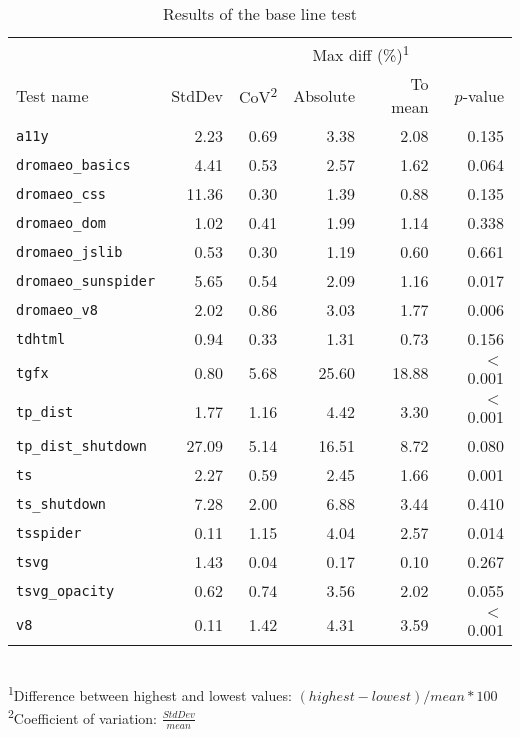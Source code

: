 \begin{table}
    \centering
    \caption{Results of the base line test}
    \label{tab:bg:results}
    \begin{tabular}{lrrrrr}
        \toprule
        & & & \multicolumn{2}{c}{Max diff (\%)\textsuperscript{1}} & \\
        \cmidrule(lr){4-5}
        Test name                   & StdDev & CoV\textsuperscript{2}  & Absolute & To mean & $p$-value \\
        \midrule
        \texttt{a11y}               & 2.23   & 0.69 & 3.38     & 2.08    & 0.135     \\
        \texttt{dromaeo\_basics}    & 4.41   & 0.53 & 2.57     & 1.62    & 0.064     \\
        \texttt{dromaeo\_css}       & 11.36  & 0.30 & 1.39     & 0.88    & 0.135     \\
        \texttt{dromaeo\_dom}       & 1.02   & 0.41 & 1.99     & 1.14    & 0.338     \\
        \texttt{dromaeo\_jslib}     & 0.53   & 0.30 & 1.19     & 0.60    & 0.661     \\
        \texttt{dromaeo\_sunspider} & 5.65   & 0.54 & 2.09     & 1.16    & 0.017     \\
        \texttt{dromaeo\_v8}        & 2.02   & 0.86 & 3.03     & 1.77    & 0.006     \\
        \texttt{tdhtml}             & 0.94   & 0.33 & 1.31     & 0.73    & 0.156     \\
        \texttt{tgfx}               & 0.80   & 5.68 & 25.60    & 18.88   & $<$ 0.001 \\
        \texttt{tp\_dist}           & 1.77   & 1.16 & 4.42     & 3.30    & $<$ 0.001 \\
        \texttt{tp\_dist\_shutdown} & 27.09  & 5.14 & 16.51    & 8.72    & 0.080     \\
        \texttt{ts}                 & 2.27   & 0.59 & 2.45     & 1.66    & 0.001     \\
        \texttt{ts\_shutdown}       & 7.28   & 2.00 & 6.88     & 3.44    & 0.410     \\
        \texttt{tsspider}           & 0.11   & 1.15 & 4.04     & 2.57    & 0.014     \\
        \texttt{tsvg}               & 1.43   & 0.04 & 0.17     & 0.10    & 0.267     \\
        \texttt{tsvg\_opacity}      & 0.62   & 0.74 & 3.56     & 2.02    & 0.055     \\
        \texttt{v8}                 & 0.11   & 1.42 & 4.31     & 3.59    & $<$ 0.001 \\
        \bottomrule
    \end{tabular}
    \\[0.2cm]
    \footnotesize
    \RaggedRight
    \hspace{0.5cm}\textsuperscript{1}Difference between highest and lowest values: $(highest-lowest)/mean*100$\\
    \hspace{0.5cm}\textsuperscript{2}Coefficient of variation: $\frac{StdDev}{mean}$
\end{table}

